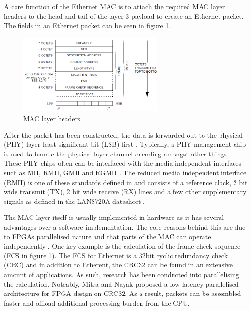 A core function of the Ethernet MAC is to attach the required MAC layer headers to the head and tail of the layer 3 payload to create an Ethernet packet. The fields 
in an Ethernet packet can be seen in figure \ref{fig:ieee-mac-headers}. 

\begin{figure}[h]
    \centering
    \includegraphics[width=0.65\textwidth]{Images/mac_packet.png}
    \caption{MAC layer headers \cite{IEEE802.3-2012}}
    \label{fig:ieee-mac-headers}
\end{figure}

After the packet has been constructed, the data is forwarded out to the physical (PHY) layer 
least significant bit (LSB) first \cite{IEEE802.3-2012}. Typically, a PHY management chip is used to handle the physical layer channel encoding amongst other things. 
These PHY chips often can be interfaced with the media independent interfaces such as MII, RMII, GMII and RGMII \cite{OptimisedEthernetMAC}. The reduced media 
independent interface (RMII) is one of these standards defined in \cite{IEEE802.3-2012} and consists of a reference clock, 2 bit wide transmit (TX), 2 bit wide 
receive (RX) lines and a few other supplementary signals as defined in the LAN8720A datasheet \cite{LAN8720ADatasheet}.


The MAC layer itself is usually implemented in hardware as it has several advantages over a software implementation. The core reasons behind this are due to 
FPGAs parallelised nature and that parts of the MAC can operate independently \cite{reducedEtherentMacFPGA}. One key example is the calculation of the 
frame check sequence (FCS in figure \ref{fig:ieee-mac-headers}). The FCS for Ethernet is a 32bit cyclic redundancy check (CRC) \cite{IEEE802.3-2012} and 
in addition to Etherent, the CRC32 can be found in an extensive amount of applications. As such, research has been conducted into parallelising the calculation. 
Noteably, Mitra and Nayak \cite{ParallelCRC} proposed a low latency parallelised architecture for FPGA design on CRC32. As a result, packets can be assembled 
faster and offload additional processing burden from the CPU. 



